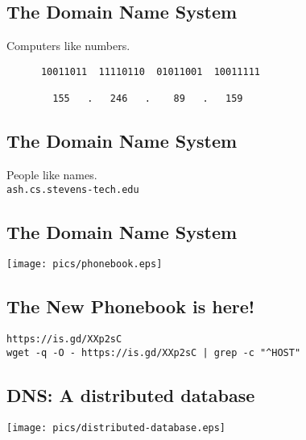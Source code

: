 \documentclass[xga]{xdvislides}
\begin{document}
\subsection{The Domain Name System}
\vspace{.5in}
\begin{center}
	\Huge
	Computers like numbers. \\
\vspace{.5in}
\begin{verbatim}
      10011011  11110110  01011001  10011111

        155   .   246   .    89   .   159
\end{verbatim}
\end{center}
\Normalsize

\subsection{The Domain Name System}
\vspace{.5in}
\begin{center}
	\Huge
	People like names. \\
\vspace{.5in}
\verb+ash.cs.stevens-tech.edu+
\end{center}
\Normalsize


\subsection{The Domain Name System}
\vspace*{\fill}
\begin{center}
	\texttt{[image: pics/phonebook.eps]}
\end{center}
\vspace*{\fill}

\subsection{The New Phonebook is here!}
\vspace*{\fill}
\begin{center}
	\verb+https://is.gd/XXp2sC+ \\
	\addvspace{.5in}
	\verb+wget -q -O - https://is.gd/XXp2sC | grep -c "^HOST"+
\end{center}
\vspace*{\fill}

\subsection{DNS: A distributed database}
\vspace*{\fill}
\begin{center}
	\texttt{[image: pics/distributed-database.eps]}
\end{center}
\vspace*{\fill}
\end{document}
